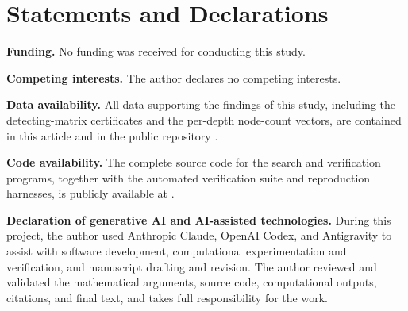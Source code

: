 \documentclass[11pt]{article}
\theoremstyle{plain}
\theoremstyle{definition}
\begin{document}
\section*{Statements and Declarations}

\noindent\textbf{Funding.} No funding was received for conducting this study.

\smallskip
\noindent\textbf{Competing interests.} The author declares no competing interests.

\smallskip
\noindent\textbf{Data availability.} All data supporting the findings of this study, including the detecting-matrix certificates and the per-depth node-count vectors, are contained in this article and in the public repository \cite{artifact}.

\smallskip
\noindent\textbf{Code availability.} The complete source code for the search and verification programs, together with the automated verification suite and reproduction harnesses, is publicly available at \cite{artifact}.

\smallskip
\noindent\textbf{Declaration of generative AI and AI-assisted technologies.} During this project, the author used Anthropic Claude, OpenAI Codex, and Antigravity to assist with software development, computational experimentation and verification, and manuscript drafting and revision. The author reviewed and validated the mathematical arguments, source code, computational outputs, citations, and final text, and takes full responsibility for the work.



\end{document}
